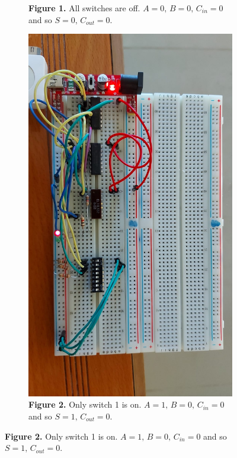 \documentclass[a4paper]{article}
\begin{document}
\begin{figure}
\begin{subfigure}[b]{0.9\textwidth}
        \caption*{\textbf{Figure 1.} All switches are off. $A=0,\,B=0,\, C_{in} = 0$ and so $S=0,\,C_{out}=0$.\vspace{2em}}
         \label{fig:alloff}
     \end{subfigure}
     \hfill
     \begin{subfigure}[b]{0.9\textwidth}
         \centering
         \includegraphics[angle=90, width=\textwidth]{1on.jpeg}
         \caption*{\textbf{Figure 2.} Only switch 1 is on. $A=1,\,B=0,\, C_{in} = 0$ and so $S=1,\,C_{out}=0$.\vspace{2em}}
         \label{fig:1on}
     \end{subfigure}
 \end{figure}
\end{document}
